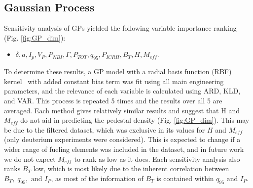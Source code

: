 \documentclass[a4paper, twoside, final, 12pt]{article}
\begin{document}
{\subsection{Gaussian Process}

Sensitivity analysis of GPs yielded the following variable importance ranking (Fig. \ref{fig:GP_dim}): 
\begin{itemize}
	\item  $\delta, a, I_p, V_P, P_{NBI},\Gamma, P_{TOT},  q_{95},  P_{ICRH}, B_T, H, M_{eff}$. 
\end{itemize}
To determine these results, a GP model with a radial basis function (RBF) kernel~\cite{kernel_cookbook} with added constant bias term was fit using all main engineering parameters, and the relevance of each variable is calculated using ARD, KLD, and VAR. This process is repeated 5 times and the results over all 5 are averaged. Each method gives relatively similar results and suggest that H and $M_{eff}$ do not aid in predicting the pedestal density (Fig. \ref{fig:GP_dim}). This may be due to the filtered dataset, which was exclusive in its values for $H$ and $M_{eff}$ (only deuterium experiments were considered). This is expected to change if a wider range of fueling elements was included in the dataset, and in future work we do not expect $M_{eff}$ to rank as low as it does. Each sensitivity analysis also ranks $B_T$ low, which is most likely due to the inherent correlation between $B_T, \; q_{95}, \text{ and } I_P$, as most of the information of $B_T$ is contained within $q_{95} \text{ and } I_P$. 

}
\end{document}

